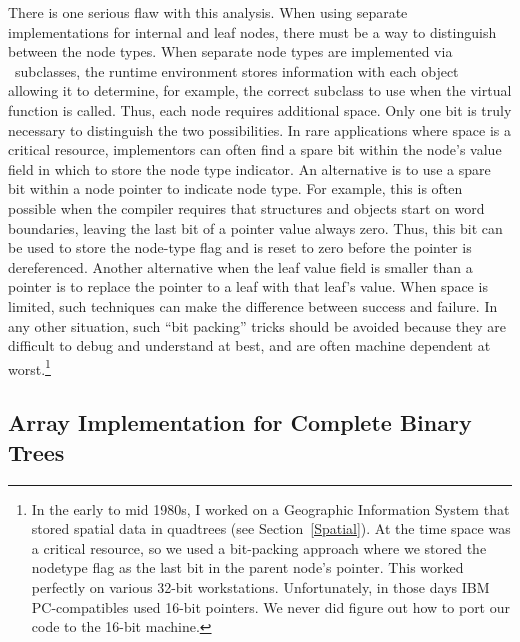There is one serious flaw with this analysis.
When using separate implementations for internal and leaf nodes,
there must be a way to distinguish between the node types.
When separate node types are implemented via \Lang\ subclasses,
the runtime environment stores information with
each object allowing it to determine, for example, the correct
subclass to use when the  virtual function is called.
Thus, each node requires additional space.
Only one bit is truly necessary to distinguish the two possibilities.
In rare applications where space is a critical resource,
implementors can often find a spare bit within the node's value field
in which to store the node type indicator.
An alternative is to use a spare bit within a node pointer to
indicate node type.
For example, this is often possible when the compiler requires that
structures and objects start on word boundaries, leaving the last bit
of a pointer value always zero.
Thus, this bit can be used to store the node-type flag and is reset to
zero before the pointer is dereferenced.
Another alternative when the leaf value field is smaller than a
pointer is to replace the pointer to a leaf with that leaf's value.
When space is limited, such techniques can make the difference between
success and failure.
In any other situation, such ``bit packing'' tricks should be
avoided because they are difficult to debug and understand at
best, and are often machine dependent at worst.\footnote{In
the early to mid 1980s, I worked on a Geographic
Information System that stored spatial data in quadtrees
(see Section~\ref{Spatial}).
At the time space was a critical resource, so we used a bit-packing
approach where we stored the nodetype flag as the last bit in the
parent node's pointer.
This worked perfectly on various 32-bit workstations.
Unfortunately, in those days IBM PC-compatibles used 16-bit pointers.
We never did figure out how to port our code to the 16-bit machine.}


\subsection{Array Implementation for Complete Binary Trees}
\label{Complete}

